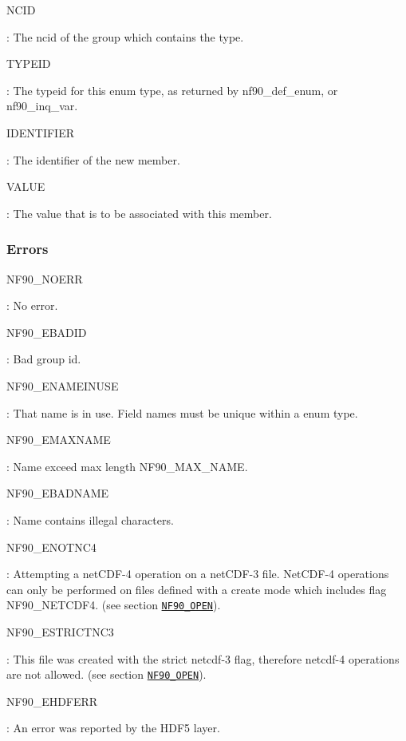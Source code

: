 {\ttfamily N\+C\+ID}

\+: The ncid of the group which contains the type.

{\ttfamily T\+Y\+P\+E\+ID}

\+: The typeid for this enum type, as returned by nf90\+\_\+def\+\_\+enum, or nf90\+\_\+inq\+\_\+var.

{\ttfamily I\+D\+E\+N\+T\+I\+F\+I\+ER}

\+: The identifier of the new member.

{\ttfamily V\+A\+L\+UE}

\+: The value that is to be associated with this member.

\subsubsection*{Errors}

{\ttfamily N\+F90\+\_\+\+N\+O\+E\+RR}

\+: No error.

{\ttfamily N\+F90\+\_\+\+E\+B\+A\+D\+ID}

\+: Bad group id.

{\ttfamily N\+F90\+\_\+\+E\+N\+A\+M\+E\+I\+N\+U\+SE}

\+: That name is in use. Field names must be unique within a enum type.

{\ttfamily N\+F90\+\_\+\+E\+M\+A\+X\+N\+A\+ME}

\+: Name exceed max length N\+F90\+\_\+\+M\+A\+X\+\_\+\+N\+A\+ME.

{\ttfamily N\+F90\+\_\+\+E\+B\+A\+D\+N\+A\+ME}

\+: Name contains illegal characters.

{\ttfamily N\+F90\+\_\+\+E\+N\+O\+T\+N\+C4}

\+: Attempting a net\+C\+D\+F-\/4 operation on a net\+C\+D\+F-\/3 file. Net\+C\+D\+F-\/4 operations can only be performed on files defined with a create mode which includes flag N\+F90\+\_\+\+N\+E\+T\+C\+D\+F4. (see section \href{#NF90_005fOPEN}{\tt N\+F90\+\_\+\+O\+P\+EN}).

{\ttfamily N\+F90\+\_\+\+E\+S\+T\+R\+I\+C\+T\+N\+C3}

\+: This file was created with the strict netcdf-\/3 flag, therefore netcdf-\/4 operations are not allowed. (see section \href{#NF90_005fOPEN}{\tt N\+F90\+\_\+\+O\+P\+EN}).

{\ttfamily N\+F90\+\_\+\+E\+H\+D\+F\+E\+RR}

\+: An error was reported by the H\+D\+F5 layer.

